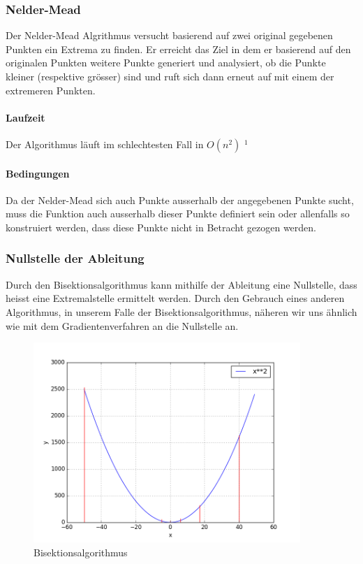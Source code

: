 \documentclass[10pt]{article}         %
\begin{document}
\subsubsection{Nelder-Mead}
Der Nelder-Mead Algrithmus versucht basierend auf zwei original gegebenen Punkten ein Extrema zu finden. Er erreicht das Ziel in dem er basierend auf den originalen Punkten weitere Punkte generiert und analysiert, ob die Punkte kleiner (respektive grösser) sind und ruft sich dann erneut auf mit einem der extremeren Punkten.

\paragraph{Laufzeit}
Der Algorithmus läuft im schlechtesten Fall in $O(n^2)$ $^1$

\paragraph{Bedingungen}
Da der Nelder-Mead sich auch Punkte ausserhalb der angegebenen Punkte sucht, muss die Funktion auch ausserhalb dieser Punkte definiert sein oder allenfalls so konstruiert werden, dass diese Punkte nicht in Betracht gezogen werden.

\subsubsection{Nullstelle der Ableitung}
Durch den Bisektionsalgorithmus kann mithilfe der Ableitung eine Nullstelle, dass heisst eine Extremalstelle ermittelt werden. Durch den Gebrauch eines anderen Algorithmus, in unserem Falle der Bisektionsalgorithmus, näheren wir uns ähnlich wie mit dem Gradientenverfahren an die Nullstelle an. 

\begin{figure}[!ht]
    \centering
    \includegraphics[width=0.9\textwidth]{bisektion}
    \caption{Bisektionsalgorithmus}\label{bisektion}
\end{figure}
\end{document}
